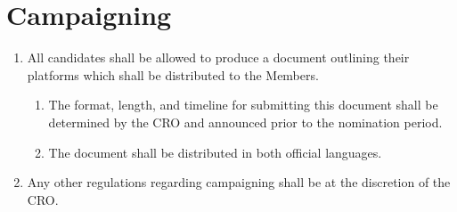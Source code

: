 \section{Campaigning}
\label{campaigning}

\begin{enumerate}
 \item All candidates shall be allowed to produce a document outlining their platforms which shall be distributed to the Members.
  \begin{enumerate}
   \item The format, length, and timeline for submitting this document shall be determined by the CRO and announced prior to the nomination period.
   \item The document shall be distributed in both official languages.
  \end{enumerate}
 \item Any other regulations regarding campaigning shall be at the discretion of the CRO.
\end{enumerate}
